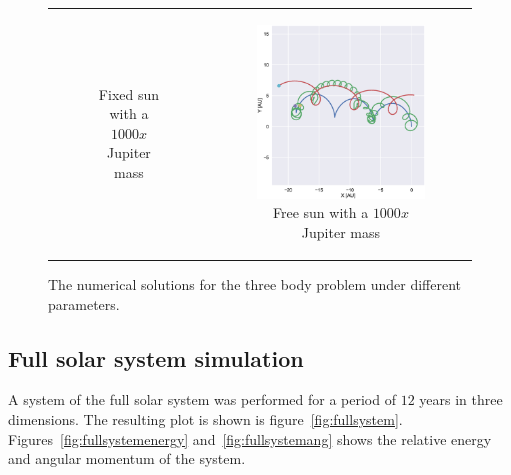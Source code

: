 \documentclass[aps,reprint]{revtex4-1}
\begin{document}
\begin{figure}
\begin{tabular}{cc}
\begin{subfigure}[b]{0.5\columnwidth}
        \caption{Fixed sun with a \(1000x\) Jupiter mass}
        \label{fix1000}
    \end{subfigure}&
    \begin{subfigure}[b]{0.5\columnwidth}
      \includegraphics[width=\columnwidth]{figures/jupiter2_100.eps}
        \caption{Free sun with a \(1000x\) Jupiter mass}
        \label{free1000}
    \end{subfigure}\\
    \end{tabular}
    \caption{The numerical solutions for the three body problem under different parameters.}\label{fig:animals}
\end{figure}

\subsection{Full solar system simulation}

A system of the full solar system was performed for a period of \(12\) years in
three dimensions. The resulting plot is shown is figure~\ref{fig:fullsystem}.
Figures~\ref{fig:fullsystemenergy} and~\ref{fig:fullsystemang} shows the
relative energy and angular momentum of the system.
\end{document}
